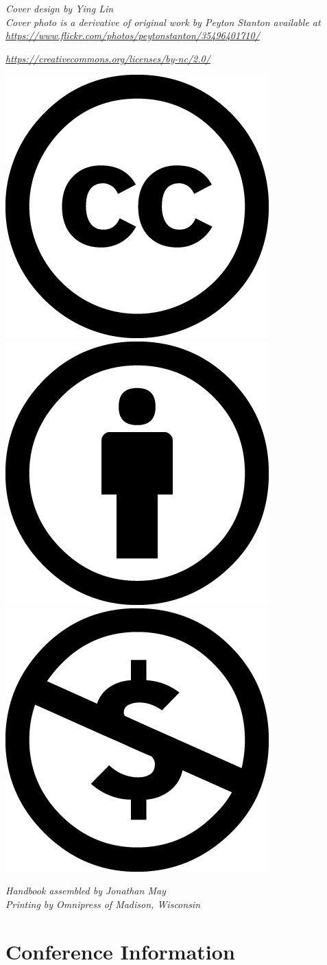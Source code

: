 \documentclass[twoside,makeidx]{book}
\begin{document}

\fancyfoot[C]{}


\thispagestyle{empty}
\vspace*{5.5in}
\noindent
\emph{Cover design by Ying Lin}\\

\noindent
\emph{Cover photo is a derivative of original work by Peyton Stanton available at \url{https://www.flickr.com/photos/peytonstanton/35496401710/}}

\noindent
\emph{\url{https://creativecommons.org/licenses/by-nc/2.0/}}

\noindent
\includegraphics[width=.15in]{content/fmatter/cc.png}\includegraphics[width=.15in]{content/fmatter/by.png}\includegraphics[width=.15in]{content/fmatter/nc.png}

\noindent
\emph{Handbook assembled by Jonathan May}\\

\noindent
\emph{Printing by Omnipress of Madison, Wisconsin}

\newpage
\cleardoublepage
\fancyfoot[C]{\thepage}
\frontmatter

\setcounter{tocdepth}{2}
\tableofcontents
\mainmatter
\pagestyle{fancy}

\chapter{Conference Information}

% 
% 

% 

% 
\end{document}
